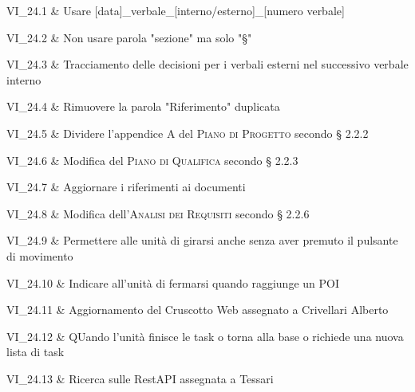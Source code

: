 VI\_24.1 & Usare [data]\_verbale\_[interno/esterno]\_[numero verbale]

\tabularnewline
VI\_24.2 & Non usare parola "sezione" ma solo "§"

\tabularnewline
VI\_24.3 & Tracciamento delle decisioni per i verbali esterni nel successivo verbale interno

\tabularnewline
VI\_24.4 & Rimuovere la parola "Riferimento" duplicata

\tabularnewline
VI\_24.5 & Dividere l'appendice A del \textsc{Piano di Progetto} secondo § 2.2.2

\tabularnewline
VI\_24.6 & Modifica del \textsc{Piano di Qualifica} secondo § 2.2.3

\tabularnewline
VI\_24.7 & Aggiornare i riferimenti ai documenti

\tabularnewline
VI\_24.8 & Modifica dell'\textsc{Analisi dei Requisiti} secondo § 2.2.6

\tabularnewline
VI\_24.9 & Permettere alle unità di girarsi anche senza aver premuto il pulsante di movimento

\tabularnewline
VI\_24.10 & Indicare all'unità di fermarsi quando raggiunge un POI

\tabularnewline
VI\_24.11 & Aggiornamento del Cruscotto Web assegnato a Crivellari Alberto

\tabularnewline
VI\_24.12 & QUando l'unità finisce le task o torna alla base o richiede una nuova lista di task

\tabularnewline
VI\_24.13 & Ricerca sulle RestAPI assegnata a Tessari